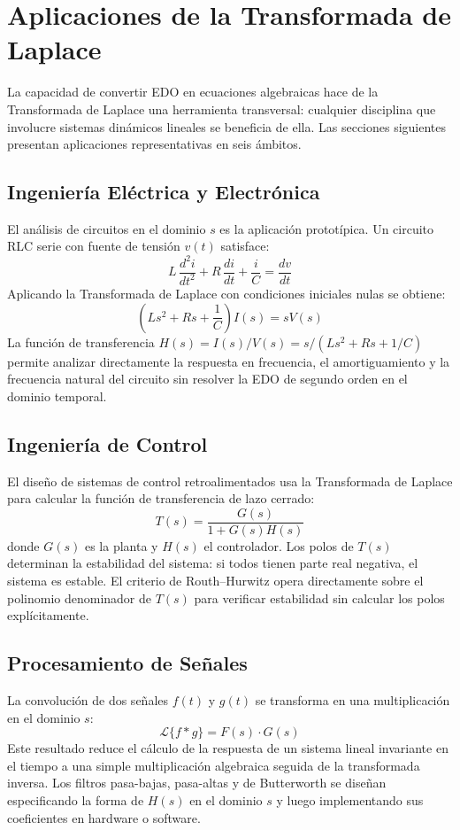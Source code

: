 \documentclass[12pt,letterpaper]{report}
\numberwithin{equation}{chapter}
\numberwithin{figure}{chapter}
\numberwithin{table}{chapter}
\begin{document}
\section{Aplicaciones de la Transformada de Laplace}

La capacidad de convertir EDO en ecuaciones algebraicas hace de la Transformada de Laplace una herramienta transversal: cualquier disciplina que involucre sistemas dinámicos lineales se beneficia de ella. Las secciones siguientes presentan aplicaciones representativas en seis ámbitos.

\subsection{Ingeniería Eléctrica y Electrónica}

El análisis de circuitos en el dominio $s$ es la aplicación prototípica. Un circuito RLC serie con fuente de tensión $v(t)$ satisface:
\[
L\,\dfrac{d^2i}{dt^2} + R\,\dfrac{di}{dt} + \dfrac{i}{C} = \dfrac{dv}{dt}
\]
Aplicando la Transformada de Laplace con condiciones iniciales nulas se obtiene:
\[
\left(Ls^2 + Rs + \dfrac{1}{C}\right)I(s) = sV(s)
\]
La función de transferencia $H(s) = I(s)/V(s) = s/(Ls^2 + Rs + 1/C)$ permite analizar directamente la respuesta en frecuencia, el amortiguamiento y la frecuencia natural del circuito sin resolver la EDO de segundo orden en el dominio temporal.

\subsection{Ingeniería de Control}

El diseño de sistemas de control retroalimentados usa la Transformada de Laplace para calcular la función de transferencia de lazo cerrado:
\[
T(s) = \dfrac{G(s)}{1 + G(s)H(s)}
\]
donde $G(s)$ es la planta y $H(s)$ el controlador. Los polos de $T(s)$ determinan la estabilidad del sistema: si todos tienen parte real negativa, el sistema es estable. El criterio de Routh–Hurwitz opera directamente sobre el polinomio denominador de $T(s)$ para verificar estabilidad sin calcular los polos explícitamente.

\subsection{Procesamiento de Señales}

La convolución de dos señales $f(t)$ y $g(t)$ se transforma en una multiplicación en el dominio $s$:
\[
\mathcal{L}\{f * g\} = F(s)\cdot G(s)
\]
Este resultado reduce el cálculo de la respuesta de un sistema lineal invariante en el tiempo a una simple multiplicación algebraica seguida de la transformada inversa. Los filtros pasa-bajas, pasa-altas y de Butterworth se diseñan especificando la forma de $H(s)$ en el dominio $s$ y luego implementando sus coeficientes en hardware o software.
\end{document}

